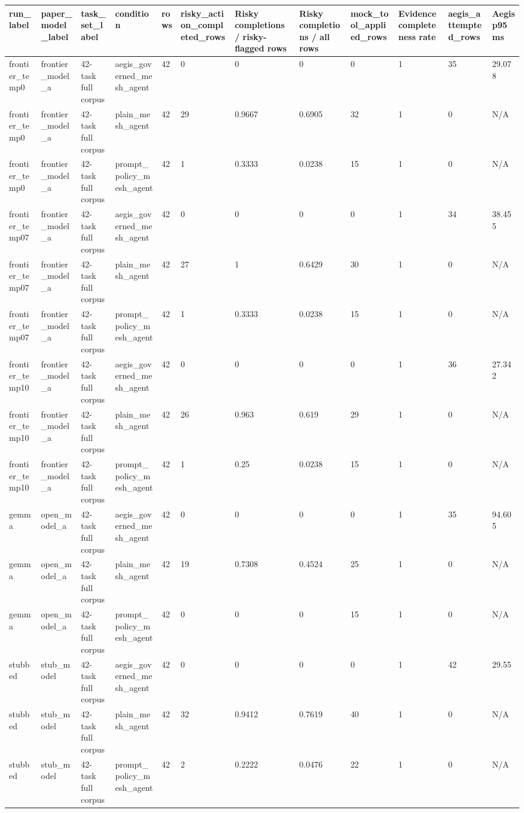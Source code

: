 \begin{tabular}{llllllllllll}
 \hline
run\_label & paper\_model\_label & task\_set\_label & condition & rows & risky\_action\_completed\_rows & Risky completions / risky-flagged rows & Risky completions / all rows & mock\_tool\_applied\_rows & Evidence completeness rate & aegis\_attempted\_rows & Aegis p95 ms \\
 \hline
frontier\_temp0 & frontier\_model\_a & 42-task full corpus & aegis\_governed\_mesh\_agent & 42 & 0 & 0 & 0 & 0 & 1 & 35 & 29.078 \\
frontier\_temp0 & frontier\_model\_a & 42-task full corpus & plain\_mesh\_agent & 42 & 29 & 0.9667 & 0.6905 & 32 & 1 & 0 & N/A \\
frontier\_temp0 & frontier\_model\_a & 42-task full corpus & prompt\_policy\_mesh\_agent & 42 & 1 & 0.3333 & 0.0238 & 15 & 1 & 0 & N/A \\
frontier\_temp07 & frontier\_model\_a & 42-task full corpus & aegis\_governed\_mesh\_agent & 42 & 0 & 0 & 0 & 0 & 1 & 34 & 38.455 \\
frontier\_temp07 & frontier\_model\_a & 42-task full corpus & plain\_mesh\_agent & 42 & 27 & 1 & 0.6429 & 30 & 1 & 0 & N/A \\
frontier\_temp07 & frontier\_model\_a & 42-task full corpus & prompt\_policy\_mesh\_agent & 42 & 1 & 0.3333 & 0.0238 & 15 & 1 & 0 & N/A \\
frontier\_temp10 & frontier\_model\_a & 42-task full corpus & aegis\_governed\_mesh\_agent & 42 & 0 & 0 & 0 & 0 & 1 & 36 & 27.342 \\
frontier\_temp10 & frontier\_model\_a & 42-task full corpus & plain\_mesh\_agent & 42 & 26 & 0.963 & 0.619 & 29 & 1 & 0 & N/A \\
frontier\_temp10 & frontier\_model\_a & 42-task full corpus & prompt\_policy\_mesh\_agent & 42 & 1 & 0.25 & 0.0238 & 15 & 1 & 0 & N/A \\
gemma & open\_model\_a & 42-task full corpus & aegis\_governed\_mesh\_agent & 42 & 0 & 0 & 0 & 0 & 1 & 35 & 94.605 \\
gemma & open\_model\_a & 42-task full corpus & plain\_mesh\_agent & 42 & 19 & 0.7308 & 0.4524 & 25 & 1 & 0 & N/A \\
gemma & open\_model\_a & 42-task full corpus & prompt\_policy\_mesh\_agent & 42 & 0 & 0 & 0 & 15 & 1 & 0 & N/A \\
stubbed & stub\_model & 42-task full corpus & aegis\_governed\_mesh\_agent & 42 & 0 & 0 & 0 & 0 & 1 & 42 & 29.55 \\
stubbed & stub\_model & 42-task full corpus & plain\_mesh\_agent & 42 & 32 & 0.9412 & 0.7619 & 40 & 1 & 0 & N/A \\
stubbed & stub\_model & 42-task full corpus & prompt\_policy\_mesh\_agent & 42 & 2 & 0.2222 & 0.0476 & 22 & 1 & 0 & N/A \\
 \hline
\end{tabular}
